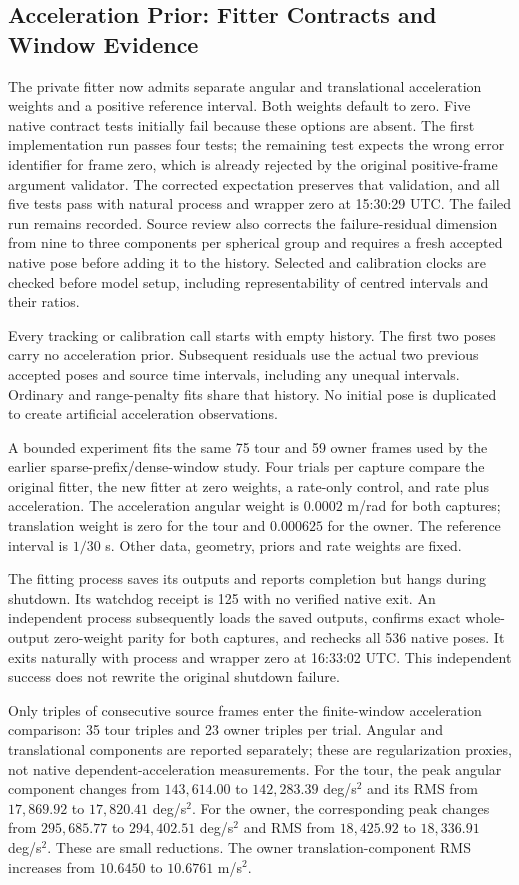 \documentclass[11pt,a4paper]{article}
\begin{document}
\subsection{Acceleration Prior: Fitter Contracts and Window Evidence}
The private fitter now admits separate angular and translational acceleration
weights and a positive reference interval. Both weights default to zero.
Five native contract tests initially fail because these options are absent.
The first implementation run passes four tests; the remaining test expects
the wrong error identifier for frame zero, which is already rejected by
the original positive-frame argument validator. The corrected expectation
preserves that validation, and all five tests pass with natural process and
wrapper zero at 15:30:29 UTC. The failed run remains recorded. Source review
also corrects the failure-residual dimension from nine to three components
per spherical group and requires a fresh accepted native pose before adding
it to the history. Selected and calibration clocks are checked before model
setup, including representability of centred intervals and their ratios.

Every tracking or calibration call starts with empty history. The first two
poses carry no acceleration prior. Subsequent residuals use the actual two
previous accepted poses and source time intervals, including any unequal
intervals. Ordinary and range-penalty fits share that history. No initial
pose is duplicated to create artificial acceleration observations.

A bounded experiment fits the same 75 tour and 59 owner frames used by the
earlier sparse-prefix/dense-window study. Four trials per capture compare
the original fitter, the new fitter at zero weights, a rate-only control,
and rate plus acceleration. The acceleration angular weight is $0.0002$
m/rad for both captures; translation weight is zero for the tour and
$0.000625$ for the owner. The reference interval is $1/30$ s. Other data,
geometry, priors and rate weights are fixed.

The fitting process saves its outputs and reports completion but hangs
during shutdown. Its watchdog receipt is 125 with no verified native exit.
An independent process subsequently loads the saved outputs, confirms exact
whole-output zero-weight parity for both captures, and rechecks all 536
native poses. It exits naturally with process and wrapper zero at
16:33:02 UTC. This independent success does not rewrite the original
shutdown failure.

Only triples of consecutive source frames enter the finite-window
acceleration comparison: 35 tour triples and 23 owner triples per trial.
Angular and translational components are reported separately; these are
regularization proxies, not native dependent-acceleration measurements.
For the tour, the peak angular component changes from $143,614.00$ to
$142,283.39$ deg/s$^2$ and its RMS from $17,869.92$ to $17,820.41$ deg/s$^2$.
For the owner, the corresponding peak changes from $295,685.77$ to
$294,402.51$ deg/s$^2$ and RMS from $18,425.92$ to $18,336.91$ deg/s$^2$.
These are small reductions. The owner translation-component RMS increases
from $10.6450$ to $10.6761$ m/s$^2$.
\end{document}
